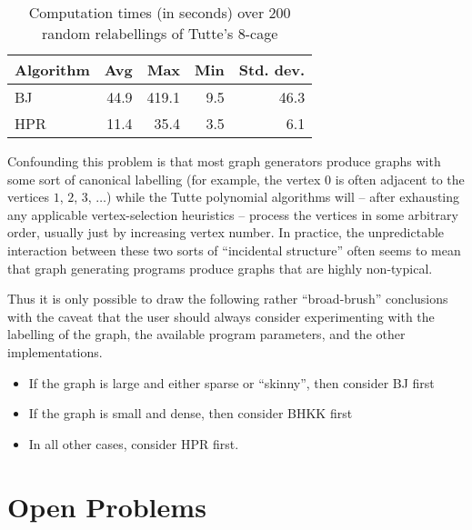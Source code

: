 \begin{table}
\begin{tabular}{l|rrrr}
Algorithm & Avg & Max & Min & Std. dev.\\
\hline
BJ & 44.9 & 419.1 & 9.5 & 46.3\\
HPR & 11.4 & 35.4 & 3.5 & 6.1\\
\end{tabular}
\caption{Computation times (in seconds) over 200 random relabellings of Tutte's 8-cage}
\label{tutcox}
\end{table}

Confounding this problem is that most graph generators produce graphs with some sort of canonical labelling (for example, the vertex $0$ is often adjacent to the vertices $1$, $2$, $3$, $\ldots$) while the Tutte polynomial algorithms will -- after exhausting any applicable vertex-selection heuristics -- process the vertices in some arbitrary order, usually just by increasing vertex number. In practice, the unpredictable interaction between these two sorts of ``incidental structure'' often seems to mean that graph generating programs
produce graphs that are highly non-typical.  %


Thus it is only possible to draw the following rather ``broad-brush'' conclusions with the caveat that the user should always consider experimenting with the labelling of the graph, the available program parameters, and the other implementations.
\begin{itemize}
\setlength{\itemsep}{0pt}
\item If the graph is large and either sparse or ``skinny'', then consider BJ first
\item If the graph is small and dense, then consider BHKK first
\item In all other cases, consider HPR first.
\end{itemize}



\section{Open Problems}





